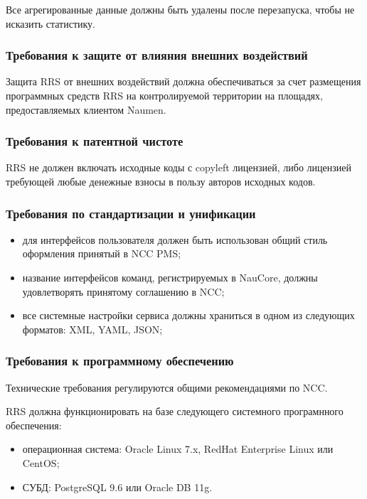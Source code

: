 Все агрегированные данные должны быть удалены после перезапуска, чтобы не исказить статистику.

\subsubsection{Требования к защите от влияния внешних воздействий}

Защита RRS от внешних воздействий должна обеспечиваться за счет размещения программных средств RRS на контролируемой территории на площадях, предоставляемых клиентом Naumen.

\subsubsection{Требования к патентной чистоте}

RRS не должен включать исходные коды с copyleft лицензией, либо лицензией требующей любые денежные взносы в пользу авторов исходных кодов.

\subsubsection{Требования по стандартизации и унификации}

\begin{itemize}
    \item для интерфейсов пользователя должен быть использован общий стиль оформления принятый в NCC PMS;
    \item название интерфейсов команд, регистрируемых в NauCore, должны удовлетворять принятому соглашению в NCC;
    \item все системные настройки сервиса должны храниться в одном из следующих форматов: XML, YAML, JSON\@;
\end{itemize}

\subsubsection{Требования к программному обеспечению}

Технические требования регулируются общими рекомендациями по NCC\@.

RRS должна функционировать на базе следующего системного програмнного обеспечения:
\begin{itemize}
    \item операционная система: Oracle Linux 7.x, RedHat Enterprise Linux или CentOS;
    \item СУБД: PostgreSQL 9.6 или Oracle DB 11g.
\end{itemize}


